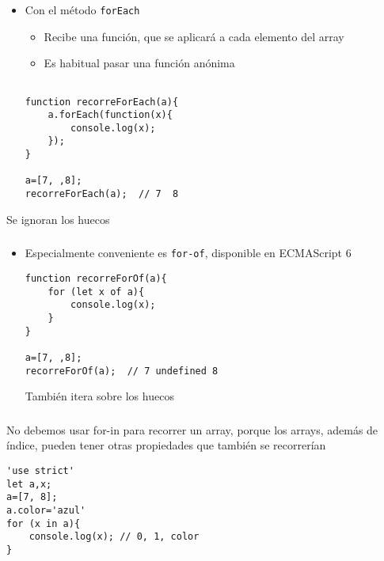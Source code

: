 \documentclass[ucs]{beamer}
\begin{document}
\begin{frame}[fragile]
\begin{itemize}

\item
Con el método 
\verb|forEach| 

    \begin{itemize}
    \item
Recibe una función, que se aplicará a cada elemento
del array

    \item
Es habitual pasar una función anónima
    \end{itemize}


  \begin{scriptsize}
  \begin{verbatim}

function recorreForEach(a){
    a.forEach(function(x){
        console.log(x);
    });
}

a=[7, ,8];
recorreForEach(a);  // 7  8
  \end{verbatim}
  \end{scriptsize}

\end{itemize}

Se ignoran los huecos
\end{frame}



\begin{frame}[fragile]
\frametitle{}
\begin{itemize}
\item
Especialmente conveniente es \verb|for-of|, disponible en ECMAScript 6


  \begin{scriptsize}
  \begin{verbatim}
function recorreForOf(a){
    for (let x of a){
        console.log(x);
    }
}

a=[7, ,8];
recorreForOf(a);  // 7 undefined 8
  \end{verbatim}
  \end{scriptsize}


También itera sobre los huecos
\end{itemize}

\end{frame}


\begin{frame}[fragile]
\frametitle{}

No debemos usar for-in para recorrer un array, porque
los arrays, además de índice, pueden tener otras propiedades
que también se recorrerían


  \begin{scriptsize}
  \begin{verbatim}
'use strict'
let a,x;
a=[7, 8];
a.color='azul'
for (x in a){
    console.log(x); // 0, 1, color
}
  \end{verbatim}
  \end{scriptsize}

\end{frame}
\end{document}
